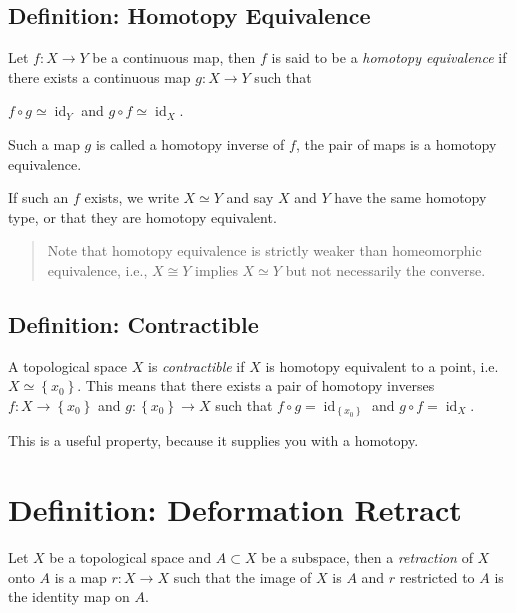 \hypertarget{definition-homotopy-equivalence}{%
\subsection{Definition: Homotopy
Equivalence}\label{definition-homotopy-equivalence}}

Let \(f: X \to Y\) be a continuous map, then \(f\) is said to be a
\emph{homotopy equivalence} if there exists a continuous map
\(g: X \to Y\) such that

\(f\circ g \simeq\operatorname{id}_Y\) and
\(g\circ f \simeq\operatorname{id}_X\).

Such a map \(g\) is called a homotopy inverse of \(f\), the pair of maps
is a homotopy equivalence.

If such an \(f\) exists, we write \(X \simeq Y\) and say \(X\) and \(Y\)
have the same homotopy type, or that they are homotopy equivalent.

\begin{quote}
Note that homotopy equivalence is strictly weaker than homeomorphic
equivalence, i.e., \(X\cong Y\) implies \(X \simeq Y\) but not
necessarily the converse.
\end{quote}

\hypertarget{definition-contractible}{%
\subsection{Definition: Contractible}\label{definition-contractible}}

A topological space \(X\) is \emph{contractible} if \(X\) is homotopy
equivalent to a point, i.e.~\(X \simeq\left\{{x_0}\right\}\). This means
that there exists a pair of homotopy inverses
\(f: X \to\left\{{x_0}\right\}\) and \(g:\left\{{x_0}\right\} \to X\)
such that \(f\circ g = \operatorname{id}_{\left\{{x_0}\right\}}\) and
\(g\circ f = \operatorname{id}_X\).

This is a useful property, because it supplies you with a homotopy.

\hypertarget{definition-deformation-retract}{%
\section{Definition: Deformation
Retract}\label{definition-deformation-retract}}

Let \(X\) be a topological space and \(A \subset X\) be a subspace, then
a \emph{retraction} of \(X\) onto \(A\) is a map \(r: X\to X\) such that
the image of \(X\) is \(A\) and \(r\) restricted to \(A\) is the
identity map on \(A\).

